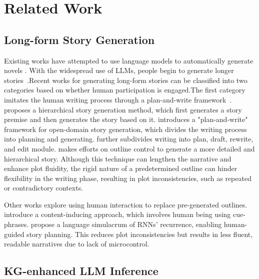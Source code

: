 \section{Related Work}

\subsection{Long-form Story Generation}

Existing works have attempted to use language models to automatically generate novels \cite{Re3, DOC}. With the widespread use of LLMs, people begin to generate longer stories~\citep{RecurrentGPT}.Recent works for generating long-form stories can be classified into two categories based on whether human participation is engaged.The first category imitates the human writing process through a plan-and-write framework~\cite{planAndWrite}. ~\citet{facebook2018} proposes a hierarchical story generation method, which first generates a story premise and then generates the story based on it. \citet{planAndWrite} introduces a "plan-and-write" framework for open-domain story generation, which divides the writing process into planning and generating. \citet{Re3} further subdivides writing into plan, draft, rewrite, and edit module. \citet{DOC} makes efforts on outline control to generate a more detailed and hierarchical story. Although this technique can lengthen the narrative and enhance plot fluidity, the rigid nature of a predetermined outline can hinder flexibility in the writing phase, resulting in plot inconsistencies, such as repeated or contradictory contexts.



Other works \cite{RecurrentGPT, brahman2020cue} explore using human interaction to replace pre-generated outlines.~\citet{brahman2020cue} introduce a content-inducing approach, which involves human being using cue-phrases. \citet{RecurrentGPT} propose a language simulacrum of RNNs' recurrence, enabling human-guided story planning. This reduces plot inconsistencies but results in less fluent, readable narratives due to lack of microcontrol.



\subsection{KG-enhanced LLM Inference}

